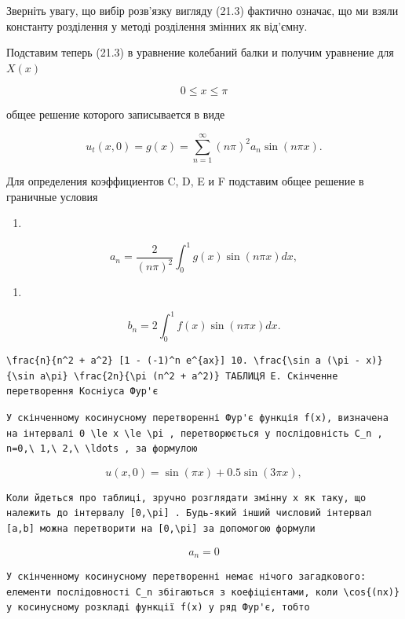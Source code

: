 \documentclass[
  ukrainian,
]{article}
\providecommand{\tightlist}{%
  \setlength{\itemsep}{0pt}\setlength{\parskip}{0pt}}
\begin{document}
Зверніть увагу, що вибір розв'язку вигляду (21.3) фактично означає, що
ми взяли константу розділення у методі розділення змінних як від'ємну.

Подставим теперь (21.3) в уравнение колебаний балки и получим уравнение
для \(X\left(x\right)\)

\[
0 \le x \le \pi
\]

общее решение которого записывается в виде

\[
u_t(x, 0) = g(x) = \sum_{n=1}^{\infty} (n\pi)^2 a_n \sin(n\pi x).
\]

Для определения коэффициентов C, D, E и F подставим общее решение в
граничные условия

\begin{enumerate}
\def\labelenumi{\arabic{enumi}.}
\tightlist
\item
\end{enumerate}

\[
a_n = \frac{2}{(n\pi)^2} \int_0^1 g(x) \sin(n\pi x) dx,
\]

\begin{enumerate}
\def\labelenumi{\arabic{enumi}.}
\setcounter{enumi}{8}
\tightlist
\item
\end{enumerate}

\[
b_n = 2 \int_0^1 f(x) \sin(n\pi x) dx.
\]

\begin{verbatim}
\frac{n}{n^2 + a^2} [1 - (-1)^n e^{ax}] 10. \frac{\sin a (\pi - x)}{\sin a\pi} \frac{2n}{\pi (n^2 + a^2)} ТАБЛИЦЯ E. Скінченне перетворення Косніуса Фур'є
\end{verbatim}

\begin{verbatim}
У скінченному косинусному перетворенні Фур'є функція f(x), визначена на інтервалі 0 \le x \le \pi , перетворюється у послідовність C_n , n=0,\ 1,\ 2,\ \ldots , за формулою
\end{verbatim}

\[
u(x, 0) = \sin(\pi x) + 0.5 \sin(3\pi x),
\]

\begin{verbatim}
Коли йдеться про таблиці, зручно розглядати змінну x як таку, що належить до інтервалу [0,\pi] . Будь-який інший числовий інтервал [a,b] можна перетворити на [0,\pi] за допомогою формули
\end{verbatim}

\[
a_n=0
\]

\begin{verbatim}
У скінченному косинусному перетворенні немає нічого загадкового: елементи послідовності C_n збігаються з коефіцієнтами, коли \cos{(nx)} у косинусному розкладі функції f(x) у ряд Фур'є, тобто
\end{verbatim}
\end{document}
